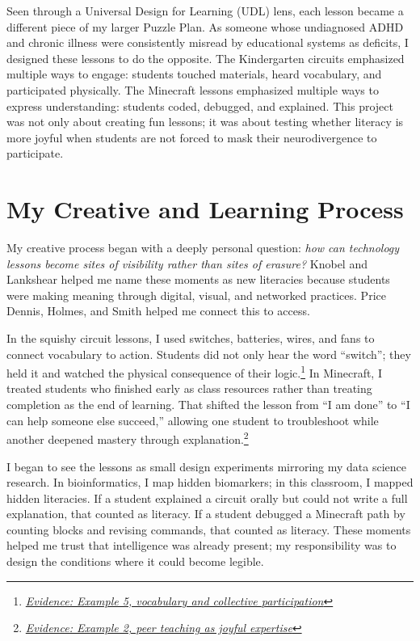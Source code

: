 \documentclass[11pt]{article}
\begin{document}
Seen through a Universal Design for Learning (UDL) lens, each lesson became a different piece of my larger Puzzle Plan. As someone whose undiagnosed ADHD and chronic illness were consistently misread by educational systems as deficits, I designed these lessons to do the opposite. The Kindergarten circuits emphasized multiple ways to engage: students touched materials, heard vocabulary, and participated physically. The Minecraft lessons emphasized multiple ways to express understanding: students coded, debugged, and explained. This project was not only about creating fun lessons; it was about testing whether literacy is more joyful when students are not forced to mask their neurodivergence to participate.



\newpage
\section*{My Creative and Learning Process}

My creative process began with a deeply personal question: \textit{how can technology lessons become sites of visibility rather than sites of erasure?} Knobel and Lankshear helped me name these moments as new literacies because students were making meaning through digital, visual, and networked practices. Price Dennis, Holmes, and Smith helped me connect this to access.

In the squishy circuit lessons, I used switches, batteries, wires, and fans to connect vocabulary to action. Students did not only hear the word ``switch''; they held it and watched the physical consequence of their logic.\footnote{\href{https://github.com/pzg8794/EDU498-joy_oriented_literacy_pursuit_journal/blob/main/kindergarten-circuit-demo-airplane-prep-evidence.md}{\textit{Evidence: Example 5, vocabulary and collective participation}}} In Minecraft, I treated students who finished early as class resources rather than treating completion as the end of learning. That shifted the lesson from ``I am done'' to ``I can help someone else succeed,'' allowing one student to troubleshoot while another deepened mastery through explanation.\footnote{\href{https://github.com/pzg8794/EDU498-joy_oriented_literacy_pursuit_journal/blob/main/grade-4-minecraft-agent-challenge-evidence.md}{\textit{Evidence: Example 2, peer teaching as joyful expertise}}}

I began to see the lessons as small design experiments mirroring my data science research. In bioinformatics, I map hidden biomarkers; in this classroom, I mapped hidden literacies. If a student explained a circuit orally but could not write a full explanation, that counted as literacy. If a student debugged a Minecraft path by counting blocks and revising commands, that counted as literacy. These moments helped me trust that intelligence was already present; my responsibility was to design the conditions where it could become legible.
\end{document}
